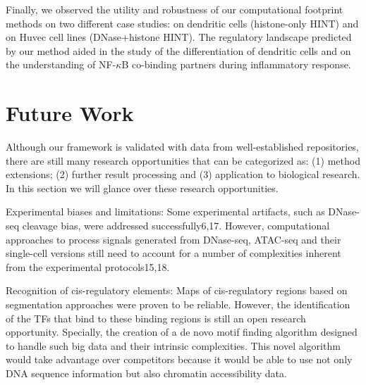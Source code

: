 Finally, we observed the utility and robustness of our computational footprint methods on two different case studies: on dendritic cells (histone-only HINT) and on Huvec cell lines (DNase+histone HINT). The regulatory landscape predicted by our method aided in the study of the differentiation of dendritic cells and on the understanding of NF-$\kappa$B co-binding partners during inflammatory response.

\section{Future Work}
\label{sec:future.work}

Although our framework is validated with data from well-established repositories, there are still many research opportunities that can be categorized as: (1) method extensions; (2) further result processing and (3) application to biological research. In this section we will glance over these research opportunities.





Experimental biases and limitations: Some experimental artifacts, such as DNase-seq cleavage bias, were addressed successfully6,17. However, computational approaches to process signals generated from DNase-seq, ATAC-seq and their single-cell versions still need to account for a number of complexities inherent from the experimental protocols15,18.

Recognition of cis-regulatory elements: Maps of cis-regulatory regions based on segmentation approaches were proven to be reliable. However, the identification of the TFs that bind to these binding regions is still an open research opportunity. Specially, the creation of a de novo motif finding algorithm designed to handle such big data and their intrinsic complexities. This novel algorithm would take advantage over competitors because it would be able to use not only DNA sequence information but also chromatin accessibility data.

